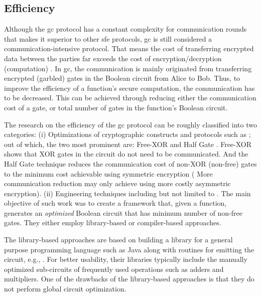 \subsection{Efficiency}
Although the \acrshort{gc} protocol has a constant complexity for communication rounds that makes it superior to other \acrshort{sfe} protocols, \acrshort{gc} is still considered a communication-intensive protocol.
That means the cost of transferring encrypted data between the parties far exceeds the cost of encryption/decryption (computation) \cite{}.
In \acrshort{gc}, the communication is mainly originated from transferring encrypted (garbled) gates in the Boolean circuit from Alice to Bob.
Thus, to improve the efficiency of a function's secure computation, the communication has to be decreased.
This can be achieved through reducing either the communication cost of a gate, or total number of gates in the function's Boolean circuit.

The research on the efficiency of the \acrshort{gc} protocol can be roughly classified into two categories:
(i) Optimizations of cryptographic constructs and protocols such as \cite{kolesnikov2008improved,pinkas2009secure,bellare2012foundations,bellare2013efficient,kolesnikov2014flexor,zahur2015two}; out of which, the two most prominent are: Free-XOR \cite{kolesnikov2008improved} and Half Gate \cite{zahur2015two}.
Free-XOR shows that XOR gates in the circuit do not need to be communicated.
And the Half Gate technique reduces the communication cost of non-XOR (non-free) gates to the minimum cost achievable using symmetric encryption (
More communication reduction may only achieve using more costly asymmetric encryption).
(ii) Engineering techniques including but not limited to \cite{henecka2010tasty,huang2011faster,henecka2013faster,kreuter2013pcf,franz2014cbmc,mood2016frigate}.
The main objective of such work was to create a framework that, given a function, generates an \textit{optimized} Boolean circuit that has minimum number of non-free gates.
They either employ library-based or compiler-based approaches.

The library-based approaches are based on building a library for a general purpose programming language such as Java along with routines for emitting the circuit, e.g., \cite{huang2011faster,malka2011vmcrypt,henecka2013faster}.
For better usability, their libraries typically include the manually optimized sub-circuits of frequently used operations such as adders and multipliers.
One of the drawbacks of the library-based approaches is that they do not perform global circuit optimization.

